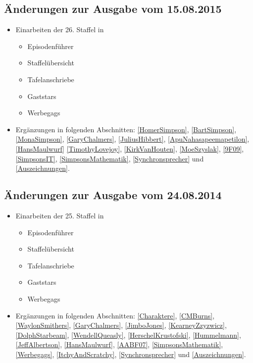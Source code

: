 \documentclass[pagesize,twoside,german]{scrbook}
\begin{document}
\subsection*{Änderungen zur Ausgabe vom 15.08.2015}
\begin{itemize}
	\item Einarbeiten der 26. Staffel in
	\begin{itemize}
		\item Episodenführer
		\item Staffelübersicht
		\item Tafelanschriebe
		\item Gaststars
		\item Werbegags
	\end{itemize}
	\item Ergänzungen in folgenden Abschnitten: \ref{HomerSimpson}, \ref{BartSimpson}, \ref{MonaSimpson}, \ref{GaryChalmers}, \ref{JuliusHibbert}, \ref{ApuNahasapeemapetilon}, \ref{HansMaulwurf} \ref{TimothyLovejoy}, \ref{KirkVanHouten}, \ref{MoeSzyslak}, \ref{9F09}, \ref{SimpsonsIT}, \ref{SimpsonsMathematik}, \ref{Synchronsprecher} und \ref{Auszeichnungen}.
\end{itemize}

\subsection*{Änderungen zur Ausgabe vom 24.08.2014}
\begin{itemize}
	\item Einarbeiten der 25. Staffel in
	\begin{itemize}
		\item Episodenführer
		\item Staffelübersicht
		\item Tafelanschriebe
		\item Gaststars
		\item Werbegags
	\end{itemize}
	\item Ergänzungen in folgenden Abschnitten: \ref{Charaktere}, \ref{CMBurns}, \ref{WaylonSmithers}, \ref{GaryChalmers}, \ref{JimboJones}, \ref{KearneyZzyzwicz}, \ref{DolphStarbeam}, \ref{WendellQueasly}, \ref{HerschelKrustofski}, \ref{Hummelmann}, \ref{JeffAlbertson}, \ref{HansMaulwurf}, \ref{AABF07}, \ref{SimpsonsMathematik}, \ref{Werbegags}, \ref{ItchyAndScratchy}, \ref{Synchronsprecher} und \ref{Auszeichnungen}.
\end{itemize}
\end{document}
